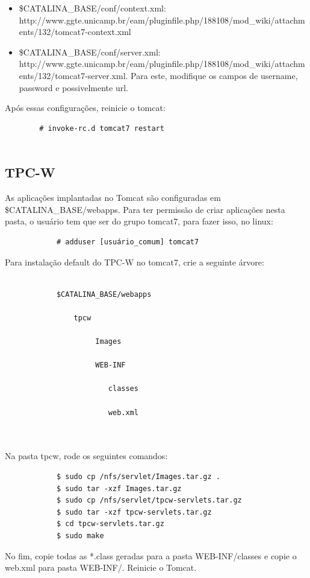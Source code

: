 \documentclass[a4paper,10pt]{article}
\begin{document}
        \begin{itemize}
            \item \$CATALINA\_BASE/conf/context.xml: http://www.ggte.unicamp.br/eam/pluginfile.php/188108/mod\_wiki/attachments/132/tomcat7-context.xml
            \item \$CATALINA\_BASE/conf/server.xml: http://www.ggte.unicamp.br/eam/pluginfile.php/188108/mod\_wiki/attachments/132/tomcat7-server.xml. Para este, modifique os campos de username, password e possivelmente url.
        \end{itemize}
        
        Após essas configurações, reinicie o tomcat:
        
        \begin{verbatim}
        # invoke-rc.d tomcat7 restart
        
        \end{verbatim}
         
        \subsection{TPC-W}
        
        As aplicações implantadas no Tomcat são configuradas em \$CATALINA\_BASE/webapps. Para ter permissão de criar aplicações nesta pasta, o usuário tem que ser do grupo tomcat7, para fazer isso, no linux:
        
        \begin{verbatim}
            # adduser [usuário_comum] tomcat7
        \end{verbatim}
        Para instalação default do TPC-W no tomcat7, crie a seguinte árvore:
        \begin{verbatim}
        
            $CATALINA_BASE/webapps
            
                tpcw
            
                     Images
            
                     WEB-INF
            
                        classes
            
                        web.xml
            
                        
        \end{verbatim}
        Na pasta tpcw, rode os seguintes comandos:
        \begin{verbatim}
            $ sudo cp /nfs/servlet/Images.tar.gz .
            $ sudo tar -xzf Images.tar.gz
            $ sudo cp /nfs/servlet/tpcw-servlets.tar.gz
            $ sudo tar -xzf tpcw-servlets.tar.gz
            $ cd tpcw-servlets.tar.gz
            $ sudo make
        \end{verbatim}
        No fim, copie todas as *.class geradas para a pasta WEB-INF/classes e copie o web.xml para pasta WEB-INF/. Reinicie o Tomcat.
       

    
\end{document}
